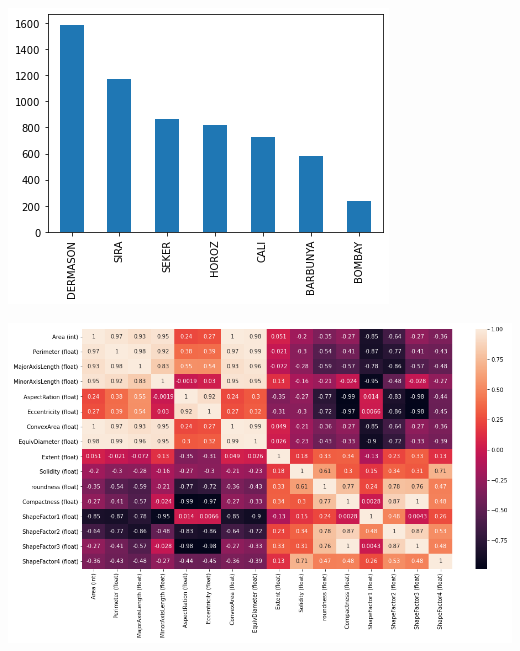 \documentclass[12pt]{extarticle}
\begin{document}
\begin{minipage}{.45\textwidth}
\begin{center}
\includegraphics[width=\linewidth]{./.ob-jupyter/0e36c24725fa023c6e39f07bc9df640645c86811.png}
\end{center}
\vspace*{-5mm}
\label{fig:figure1}
\end{minipage}
\begin{minipage}{.55\textwidth}
\begin{center}
\includegraphics[width=\linewidth]{./.ob-jupyter/da88383af5d1618a3cb0bf8008eb6ce0c4c86bce.png}
\end{center}
\vspace*{-5mm}
\label{fig:figure2}
\end{minipage}
\end{document}
